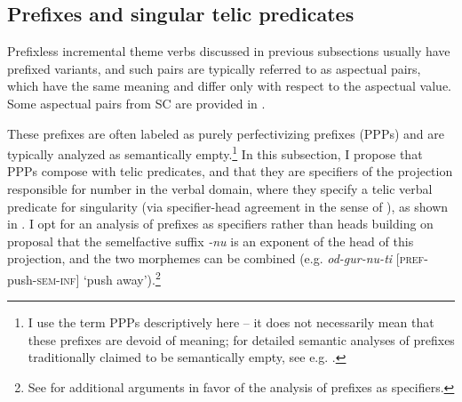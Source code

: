\documentclass[output=paper,colorlinks,citecolor=brown]{langscibook}
\begin{document}
\subsection{Prefixes and singular telic predicates} \label{mil:sec:CulminativePredicatesPrefixes}\largerpage

Prefixless incremental theme verbs discussed in previous subsections usually have prefixed variants, and such pairs are typically referred to as aspectual pairs, which have the same meaning and differ only with respect to the aspectual value. Some aspectual pairs from SC are provided in . 

\ea \label{mil:ex:aspectual-pairs}
\z
\z

\noindent These prefixes are often labeled as purely perfectivizing prefixes (PPPs) and are typically analyzed as semantically empty.\footnote{I use the term PPPs descriptively here -- it does not necessarily mean that these prefixes are devoid of meaning; for detailed semantic analyses of prefixes traditionally claimed to be semantically empty, see e.g.  \citet{EndresenSokolova2012, JandaLyashevskaya2013, Miljković2021}.} In this subsection, I propose that PPPs compose with telic predicates, and that they are specifiers of the projection responsible for number in the verbal domain, where they specify a telic verbal predicate for singularity (via specifier-head agreement in the sense of \citealt{Borer_2005}), as shown in . I opt for an analysis of prefixes as specifiers rather than heads building on  proposal that the semelfactive suffix \textit{-nu} is an exponent of the head of this projection, and the two morphemes can be combined (e.g. \textit{od-gur-nu-ti} [\textsc{pref}-push-\textsc{sem}-\textsc{inf}] `push away').\footnote{See \citet[]{Svenonius2008} for additional arguments in favor of the analysis of prefixes as specifiers.}
\end{document}
